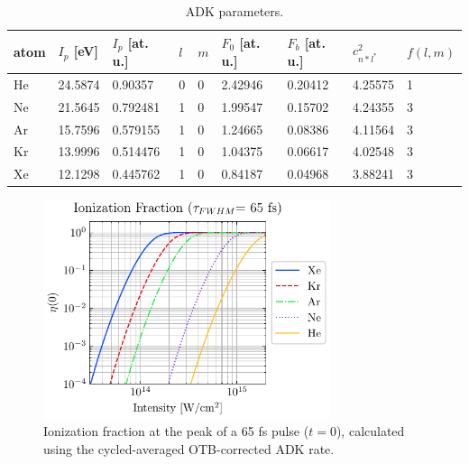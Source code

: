 \begin{table}[]
	\centering
	\begin{tabular}{l|l|l|l|l|l|l|l|l}
		atom & $I_p$ {[}eV{]} & $I_p$ {[}at. u.{]} & $l$ & $m$ & $F_0$ {[}at. u.{]} & $F_b$ {[}at. u.{]} & $c_{n*l^*}^2$ & $f(l,m)$ \\ \hline
		He & 24.5874 & 0.90357 & 0 & 0 & 2.42946 & 0.20412 & 4.25575 & 1 \\
		Ne & 21.5645 & 0.792481 & 1 & 0 & 1.99547 & 0.15702 & 4.24355 & 3 \\
		Ar & 15.7596 & 0.579155 & 1 & 0 & 1.24665 & 0.08386 & 4.11564 & 3 \\
		Kr & 13.9996 & 0.514476 & 1 & 0 & 1.04375 & 0.06617 & 4.02548 & 3 \\
		Xe & 12.1298 & 0.445762 & 1 & 0 & 0.84187 & 0.04968 & 3.88241 & 3
	\end{tabular}
	\caption{ADK parameters.}
	\label{tab:ADK-params}
\end{table}

\begin{figure}
	\centering
	\includegraphics[width=0.75\textwidth]{figures/chap1/ADK_ion_frac_TL.pdf}
	\caption{Ionization fraction at the peak of a 65 fs pulse ($t=0$), calculated using the cycled-averaged OTB-corrected ADK rate.}
	\label{fig:ADK_ion_frac}
\end{figure}

